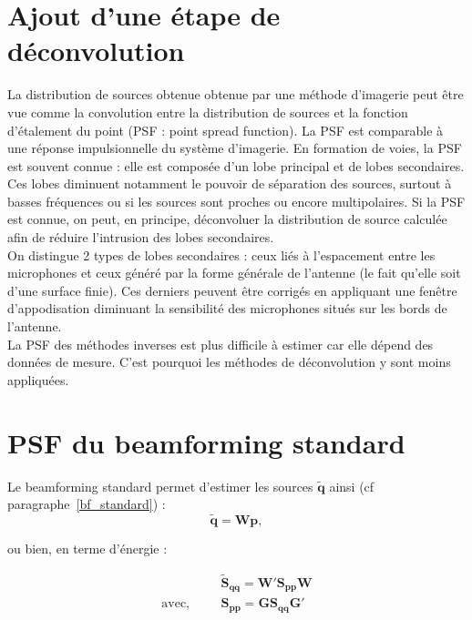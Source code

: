 \section{Ajout d'une étape de déconvolution\label{deconvolution}}

La distribution de sources obtenue obtenue par une méthode d'imagerie peut être vue comme la convolution entre la distribution de sources et la fonction d'étalement du point (PSF : point spread function). La PSF est comparable à une réponse impulsionnelle du système d'imagerie. En formation de voies, la PSF est souvent connue \citep{Bahr2011a}: elle est composée d'un lobe principal et de lobes secondaires. \\

Ces lobes diminuent notamment le pouvoir de séparation des sources, surtout à basses fréquences ou si les sources sont proches ou encore multipolaires. Si la PSF est connue, on peut, en principe, déconvoluer la distribution  de source calculée afin de réduire l'intrusion des lobes secondaires.\\

On distingue 2 types de lobes secondaires : ceux liés à l'espacement entre les microphones et ceux généré par la forme générale de l'antenne (le fait qu'elle soit d'une surface finie). Ces derniers peuvent être corrigés en appliquant une fenêtre d'appodisation diminuant la sensibilité des microphones situés sur les bords de l'antenne.\\


La PSF des méthodes inverses est plus difficile à estimer car elle dépend des données de mesure. C'est pourquoi les méthodes de déconvolution y sont moins appliquées. \\

\section{PSF du beamforming standard}

Le beamforming standard permet d'estimer les sources $\bm{\tilde{q}}$ ainsi (cf paragraphe~\ref{bf_standard}) : 
\begin{equation}
	\bm{\tilde{q}} = \bm{W}\bm{p},
\end{equation}

ou bien, en terme d'énergie : 

\begin{align}\label{bf_psf}
	~ & \bm{\tilde{S}_{qq}} = \bm{W}' \bm{S_{pp}} \bm{W}  \\
	\text{avec, ~~~~} & \bm{S_{pp}} = \bm{G S_{qq}G}'
\end{align}


